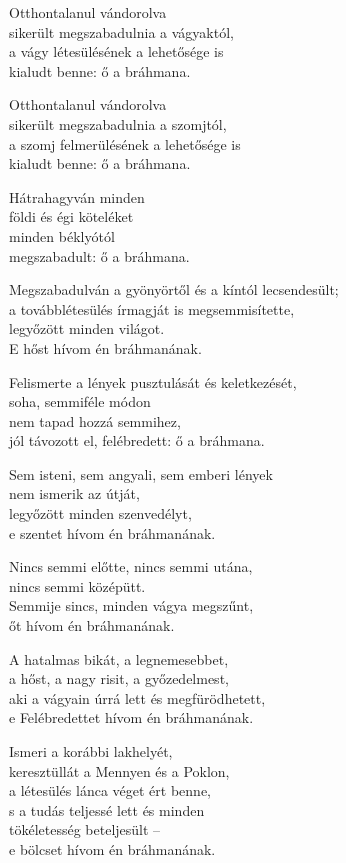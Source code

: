 \begin{dhpverse}

 Otthontalanul vándorolva\\
sikerült megszabadulnia a vágyaktól,\\
a vágy létesülésének a lehetősége is\\
kialudt benne: ő a bráhmana.

 Otthontalanul vándorolva\\
sikerült megszabadulnia a szomjtól,\\
a szomj felmerülésének a lehetősége is\\
kialudt benne: ő a bráhmana.

 Hátrahagyván minden\\
földi és égi köteléket\\
minden béklyótól\\
megszabadult: ő a bráhmana.

 Megszabadulván a gyönyörtől és a kíntól lecsendesült;\\
a továbblétesülés írmagját is megsemmisítette,\\
legyőzött minden világot.\\
E hőst hívom én bráhmanának.

 Felismerte a lények pusztulását és keletkezését,\\
soha, semmiféle módon\\
nem tapad hozzá semmihez,\\
jól távozott el, felébredett: ő a bráhmana.

 Sem isteni, sem angyali, sem emberi lények\\
nem ismerik az útját,\\
legyőzött minden szenvedélyt,\\
e szentet hívom én bráhmanának.

\end{dhpverse}
\newpage
\begin{dhpverse}

 Nincs semmi előtte, nincs semmi utána,\\
nincs semmi középütt.\\
Semmije sincs, minden vágya megszűnt,\\
őt hívom én bráhmanának.

 A hatalmas bikát, a legnemesebbet,\\
a hőst, a nagy risit, a győzedelmest,\\
aki a vágyain úrrá lett és megfürödhetett,\\
e Felébredettet hívom én bráhmanának.

 Ismeri a korábbi lakhelyét,\\
keresztüllát a Mennyen és a Poklon,\\
a létesülés lánca véget ért benne,\\
s a tudás teljessé lett és minden\\
tökéletesség beteljesült –\\
e bölcset hívom én bráhmanának.

\end{dhpverse}
